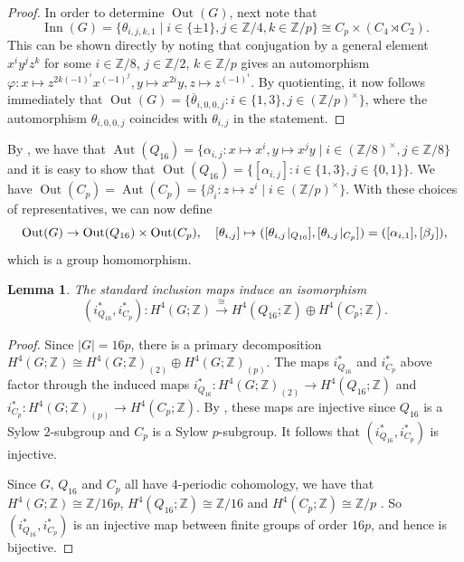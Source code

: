 \documentclass[11pt,leqno,a4paper]{amsart}
\newcommand{\Z}{\mathbb{Z}}
\DeclareMathOperator{\Aut}{Aut}
\DeclareMathOperator{\Inn}{Inn}
\DeclareMathOperator{\Out}{Out}
\newtheorem{lemma}[thm]{Lemma}
\theoremstyle{definition}
\theoremstyle{remark}
\theoremstyle{custom}
\begin{document}
\begin{proof}
In order to determine $\Out(G)$, next note that
\[ \Inn(G) = \{ \theta_{i,j,k,1} \mid i \in \{\pm 1\}, j \in \Z/4, k \in \Z/p \} \cong C_p \times (C_4 \rtimes C_2). \]
This can be shown directly by noting that conjugation by a general element $x^iy^jz^k$ for some $i \in \Z/8$, $j \in \Z/2$, $k \in \Z/p$ gives an automorphism $\varphi : x \mapsto z^{2k(-1)^i}x^{(-1)^j}, y \mapsto x^{2i}y, z \mapsto z^{(-1)^i}$.
By quotienting, it now follows immediately that
$\Out(G) = \{ \overline{\theta}_{i,0,0,j} : i \in \{1,3\}, j \in (\Z/p)^\times\}$, where the automorphism $\theta_{i,0,0,j}$ coincides with $\theta_{i,j}$ in the statement.
\end{proof}

By \cite[Proposition 8.2]{Sw60-II}, we have that 
$\Aut(Q_{16}) = \{ \alpha_{i,j} : x \mapsto x^i, y \mapsto x^jy \mid i \in (\Z/8)^\times, j \in \Z/8\}$ and it is easy to show that $\Out(Q_{16}) = \{ [\alpha_{i,j}] : i \in \{1,3\}, j \in \{0, 1\}\}$. We have $\Out(C_p) = \Aut(C_p) = \{\beta_i : z \mapsto z^i \mid i \in (\Z/p)^\times\}$. With these choices of representatives, we can now define
\[ \Out(G) \to \Out(Q_{16}) \times \Out(C_p), \quad [\theta_{i,j}] \mapsto ([\theta_{i,j}\hspace{-.75mm}\mid_{Q_{16}}], [\theta_{i,j}\hspace{-.75mm}\mid_{C_p}]) = ([\alpha_{i,1}],[\beta_j]),\]
which is a group homomorphism.

\begin{lemma} \label{lemma:h4-split}
The standard inclusion maps induce an isomorphism 
\[ (i_{Q_{16}}^*,i_{C_p}^*) : H^4(G;\Z) \xrightarrow[]{\cong} H^4(Q_{16};\Z) \oplus H^4(C_p;\Z). \]
\end{lemma}

\begin{proof}
Since $|G| = 16p$, there is a primary decomposition $H^4(G;\Z) \cong H^4(G;\Z)_{(2)} \oplus H^4(G;\Z)_{(p)}$. The maps $i_{Q_{16}}^*$ and $i_{C_p}^*$ above factor through the induced maps $i_{Q_{16}}^* : H^4(G;\Z)_{(2)} \to H^4(Q_{16};\Z)$ and $i_{C_p}^* : H^4(G;\Z)_{(p)} \to H^4(C_p;\Z)$. By \cite[XII.10.1]{CE56}, these maps are injective since $Q_{16}$ is a Sylow $2$-subgroup and $C_p$ is a Sylow $p$-subgroup. It follows that $(i_{Q_{16}}^*,i_{C_p}^*)$ is injective.

Since $G$, $Q_{16}$ and $C_p$ all have 4-periodic cohomology, we have that $H^4(G;\Z) \cong \Z/16p$, $H^4(Q_{16};\Z) \cong \Z/16$ and $H^4(C_p;\Z) \cong \Z/p$ \cite[XII.11.1]{CE56}. So $(i_{Q_{16}}^*,i_{C_p}^*)$ is an injective map between finite groups of order $16p$, and hence is bijective.  
\end{proof}
\end{document}
